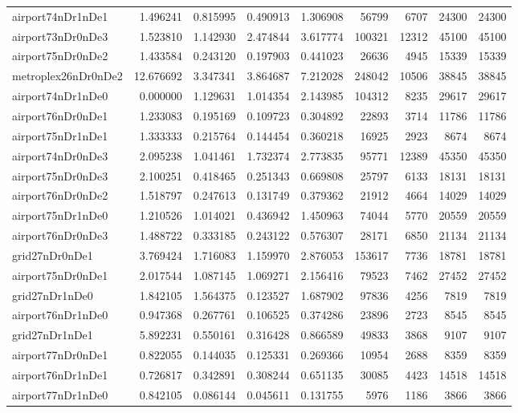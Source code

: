 \begin{longtable}{|l|r|r|r|r|r|r|r|r|}
airport74nDr1nDe1 & 1.496241 & 0.815995 & 0.490913 & 1.306908 & 56799 & 6707 & 24300 & 24300 \\
airport73nDr0nDe3 & 1.523810 & 1.142930 & 2.474844 & 3.617774 & 100321 & 12312 & 45100 & 45100 \\
airport75nDr0nDe2 & 1.433584 & 0.243120 & 0.197903 & 0.441023 & 26636 & 4945 & 15339 & 15339 \\
metroplex26nDr0nDe2 & 12.676692 & 3.347341 & 3.864687 & 7.212028 & 248042 & 10506 & 38845 & 38845 \\
airport74nDr1nDe0 & 0.000000 & 1.129631 & 1.014354 & 2.143985 & 104312 & 8235 & 29617 & 29617 \\
airport76nDr0nDe1 & 1.233083 & 0.195169 & 0.109723 & 0.304892 & 22893 & 3714 & 11786 & 11786 \\
airport75nDr1nDe1 & 1.333333 & 0.215764 & 0.144454 & 0.360218 & 16925 & 2923 & 8674 & 8674 \\
airport74nDr0nDe3 & 2.095238 & 1.041461 & 1.732374 & 2.773835 & 95771 & 12389 & 45350 & 45350 \\
airport75nDr0nDe3 & 2.100251 & 0.418465 & 0.251343 & 0.669808 & 25797 & 6133 & 18131 & 18131 \\
airport76nDr0nDe2 & 1.518797 & 0.247613 & 0.131749 & 0.379362 & 21912 & 4664 & 14029 & 14029 \\
airport75nDr1nDe0 & 1.210526 & 1.014021 & 0.436942 & 1.450963 & 74044 & 5770 & 20559 & 20559 \\
airport76nDr0nDe3 & 1.488722 & 0.333185 & 0.243122 & 0.576307 & 28171 & 6850 & 21134 & 21134 \\
grid27nDr0nDe1 & 3.769424 & 1.716083 & 1.159970 & 2.876053 & 153617 & 7736 & 18781 & 18781 \\
airport75nDr0nDe1 & 2.017544 & 1.087145 & 1.069271 & 2.156416 & 79523 & 7462 & 27452 & 27452 \\
grid27nDr1nDe0 & 1.842105 & 1.564375 & 0.123527 & 1.687902 & 97836 & 4256 & 7819 & 7819 \\
airport76nDr1nDe0 & 0.947368 & 0.267761 & 0.106525 & 0.374286 & 23896 & 2723 & 8545 & 8545 \\
grid27nDr1nDe1 & 5.892231 & 0.550161 & 0.316428 & 0.866589 & 49833 & 3868 & 9107 & 9107 \\
airport77nDr0nDe1 & 0.822055 & 0.144035 & 0.125331 & 0.269366 & 10954 & 2688 & 8359 & 8359 \\
airport76nDr1nDe1 & 0.726817 & 0.342891 & 0.308244 & 0.651135 & 30085 & 4423 & 14518 & 14518 \\
airport77nDr1nDe0 & 0.842105 & 0.086144 & 0.045611 & 0.131755 & 5976 & 1186 & 3866 & 3866 \\

\end{longtable}
